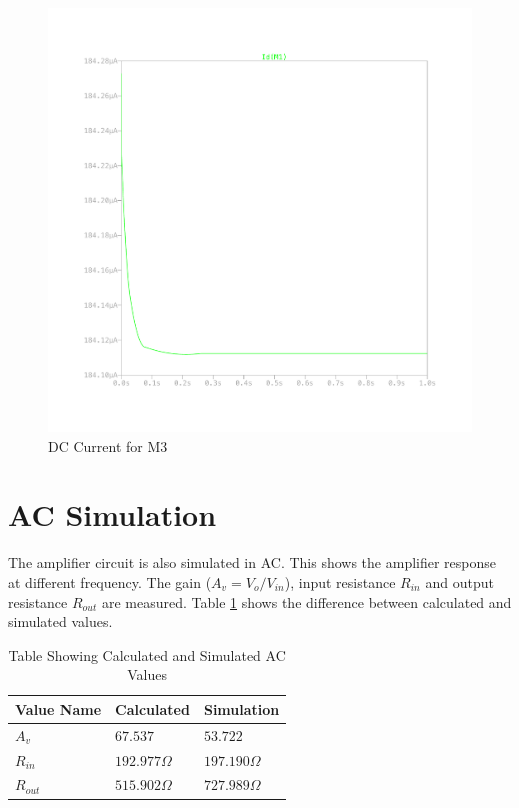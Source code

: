 \documentclass{article}
\begin{document}
\begin{figure}[H]
    \centering
    \includegraphics[height=0.4\textheight,trim={30mm 30mm 30mm 30mm}]{img/Amplifier Design M3 I.pdf}
    \caption{DC Current for M3}
    \label{fig:dc-i-m3}
\end{figure}

\section{AC Simulation}

The amplifier circuit is also simulated in AC.
This shows the amplifier response at different frequency.
The gain ($A_{v} = V_{o} / V_{in}$), input resistance $R_{in}$ and output resistance $R_{out}$ are measured.
Table \ref{tab:sim-cal-ac-values} shows the difference between calculated and simulated values.

\begin{table}[H]
    \caption{Table Showing Calculated and Simulated AC Values}
    \label{tab:sim-cal-ac-values}
    \centering
    \begin{tabular}{ l l l}
        \hline
        Value Name & Calculated       & Simulation       \\
        \hline
        $A_{v}$    & $67.537$         & $53.722$         \\
        $R_{in}$   & $192.977 \Omega$ & $197.190 \Omega$ \\
        $R_{out}$  & $515.902 \Omega$ & $727.989 \Omega$ \\
        \hline
    \end{tabular}
\end{table}
\end{document}
